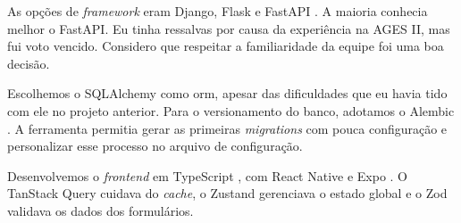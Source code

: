 As opções de \textit{framework} eram Django, Flask e FastAPI
\cite{django-docs,flask-docs,fastapi-docs}. A maioria conhecia melhor o
FastAPI. Eu tinha ressalvas por causa da experiência na AGES II, mas fui voto
vencido. Considero que respeitar a familiaridade da equipe foi uma boa decisão.

Escolhemos o SQLAlchemy \cite{sqlalchemy-docs} como \ac{orm}, apesar das
dificuldades que eu havia tido com ele no projeto anterior. Para o versionamento
do banco, adotamos o Alembic \cite{alembic-docs}. A ferramenta permitia gerar as
primeiras \textit{migrations} com pouca configuração e personalizar esse processo
no arquivo de configuração.

Desenvolvemos o \textit{frontend} em TypeScript \cite{typescript-docs}, com
React Native e Expo \cite{react-native-docs,expo-docs}. O TanStack Query cuidava do
\textit{cache}, o Zustand \cite{zustand-docs} gerenciava o estado global e o Zod
validava os dados dos formulários.
